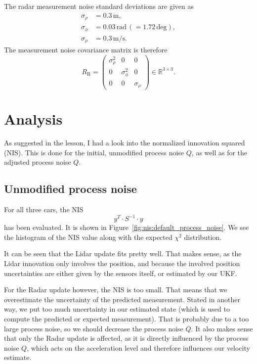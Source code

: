 \documentclass{scrartcl}
\begin{document}
The radar measurement noise standard deviations are given as
\begin{align*}
	\sigma_\rho &= 0.3\,\text{m}, \\
	\sigma_\phi &= 0.03\,\text{rad} \, (= 1.72\,\text{deg}), \\
	\sigma_{\dot{\rho}} &= 0.3\,\text{m/s}.
\end{align*}
The measurement noise covariance matrix is therefore
\begin{equation}
	R_\text{R} = \left( \begin{array}{ccc}
		\sigma_\rho^2 & 0 & 0 \\
		0 & \sigma_\phi^2 & 0 \\
		0 & 0 & \sigma_{\dot{\rho}}
		\end{array} \right) \in \mathbb{R}^{3 \times 3}.
\end{equation}

\section{Analysis}
As suggested in the lesson, I had a look into the normalized innovation squared (NIS).
This is done for the initial, unmodified process noise $Q$, as well as for
the adjusted process noise $Q$.

\subsection{Unmodified process noise}
For all three cars, the NIS
\begin{equation}
	y^T \cdot S^{-1} \cdot y
\end{equation}
has been evaluated. It is shown in Figure~\ref{fig:nis:default_process_noise}.
We see the histogram of the NIS value along with the expected $\chi^2$ distribution.

It can be seen that the Lidar update fits pretty well.
That makes sense, as the Lidar innovation only involves the position,
and because the involved position uncertainties are either given by the sensors itself,
or estimated by our UKF.

For the Radar update however, the NIS is too small.
That means that we overestimate the uncertainty of the predicted measurement.
Stated in another way, we put too much uncertainty in our estimated state
(which is used to compute the predicted or expected measurement).
That is probably due to a too large process noise, so we should decrease
the process noise $Q$.
It also makes sense that only the Radar update is affected, as it is
directly influenced by the process noise $Q$, which acts on the acceleration level
and therefore influences our velocity estimate.
\end{document}
